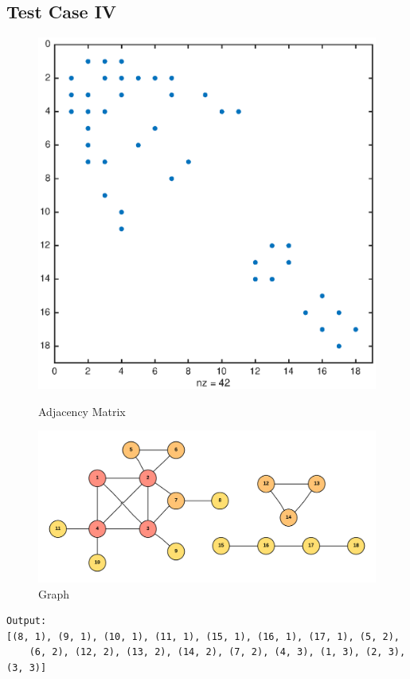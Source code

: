 \subsection{Test Case IV}
\begin{figure}[H]
  \includegraphics[width=\linewidth]{spy4.eps}
  \caption{Adjacency Matrix}
\endminipage\hfill
{}
  \includegraphics[width=\linewidth]{graph4}
  \caption{Graph}
\endminipage
\end{figure}

\begin{verbatim}
Output:
[(8, 1), (9, 1), (10, 1), (11, 1), (15, 1), (16, 1), (17, 1), (5, 2), 
	(6, 2), (12, 2), (13, 2), (14, 2), (7, 2), (4, 3), (1, 3), (2, 3), (3, 3)]
\end{verbatim}

